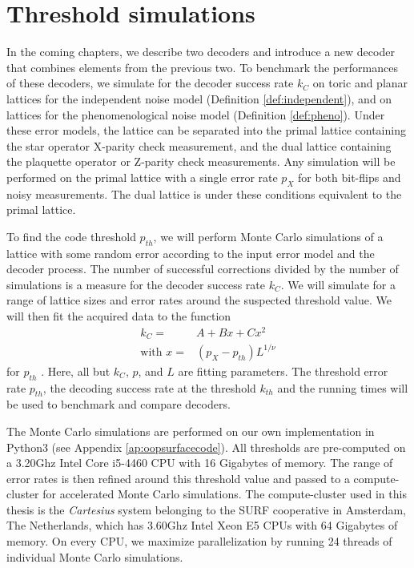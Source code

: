 \section{Threshold simulations}\label{sec:simthres}

In the coming chapters, we describe two decoders and introduce a new decoder that combines elements from the previous two. To benchmark the performances of these decoders, we simulate for the decoder success rate $k_C$ on toric and planar lattices for the independent noise model (Definition \ref{def:independent}), and on lattices for the phenomenological noise model (Definition \ref{def:pheno}). Under these error models, the lattice can be separated into the primal lattice containing the star operator X-parity check measurement, and the dual lattice containing the plaquette operator or Z-parity check measurements. Any simulation will be performed on the primal lattice with a single error rate $p_X$ for both bit-flips and noisy measurements. The dual lattice is under these conditions equivalent to the primal lattice. 

To find the code threshold $p_{th}$, we will perform Monte Carlo simulations of a lattice with some random error according to the input error model and the decoder process. The number of successful corrections divided by the number of simulations is a measure for the decoder success rate $k_C$. We will simulate for a range of lattice sizes and error rates around the suspected threshold value. We will then fit the acquired data to the function
\begin{align}\label{eq.4.fit}
  \nonumber k_{C} =& A + Bx + Cx^2 \\
  \text{with } x =& (p_X - p_{th})L^{1/\nu}
\end{align}
for $p_{th}$ \cite{wang2003confinement}. Here, all but $k_{C}$, $p$, and $L$ are fitting parameters. The threshold error rate $p_{th}$, the decoding success rate at the threshold $k_{th}$ and the running times will be used to benchmark and compare decoders. 

The Monte Carlo simulations are performed on our own implementation in Python3 (see Appendix \ref{ap:oopsurfacecode}). All thresholds are pre-computed on a 3.20Ghz Intel Core i5-4460 CPU with 16 Gigabytes of memory. The range of error rates is then refined around this threshold value and passed to a compute-cluster for accelerated Monte Carlo simulations. The compute-cluster used in this thesis is the \emph{Cartesius} system belonging to the SURF cooperative in Amsterdam, The Netherlands, which has 3.60Ghz Intel Xeon E5 CPUs with 64 Gigabytes of memory. On every CPU, we maximize parallelization by running 24 threads of individual Monte Carlo simulations. 

